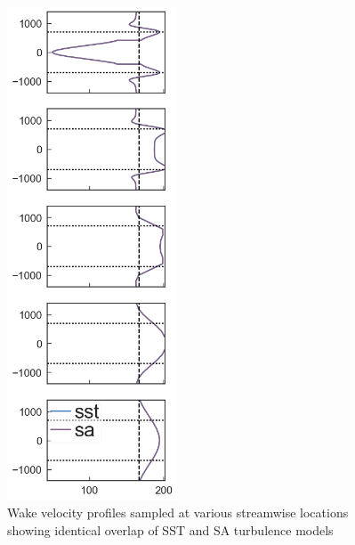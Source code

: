 \documentclass[]{aiaa-tc}%
\begin{document}
\begin{figure}[htb]
\begin{center}
\includegraphics[width=0.45\textwidth]{Images/wakelines_all_Vx.png}
\caption{Wake velocity profiles sampled at various streamwise locations showing identical overlap of SST and SA turbulence models}
\label{WakeProfilesBoth}
\end{center}
\end{figure}
\end{document}
